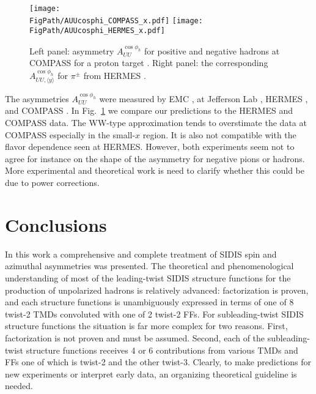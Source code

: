 \documentclass[a4paper,11pt]{article}
\newcommand*{\FigPath}{./figs}%
\begin{document}
\begin{figure}[h]
\centering
\texttt{[image: \\FigPath/AUUcosphi\_COMPASS\_x.pdf]} 
\texttt{[image: \\FigPath/AUUcosphi\_HERMES\_x.pdf]}
\caption{\label{auucosphi_jlab} 
	Left panel: asymmetry $A_{UU}^{\cos\phi_h}$ for positive and negative 
	hadrons at COMPASS for a proton target \cite{Adolph:2014pwc}. Right 
	panel: the corresponding $A_{UU, \langle y \rangle}^{\cos\phi_h}$ for $\pi^\pm$ from HERMES \cite{Airapetian:2012yg}.}
\end{figure}

The asymmetries $A_{UU}^{\cos\phi_h}$ were measured by
EMC \cite{Aubert:1983cz}, at Jefferson Lab \cite{Osipenko:2008aa,Mkrtchyan:2007sr}, 
HERMES \cite{Airapetian:2012yg}, and COMPASS \cite{Adolph:2014pwc}.
In Fig.~\ref{auucosphi_jlab} we compare our predictions to the HERMES and 
COMPASS data. 
The WW-type approximation tends to overstimate the data at
COMPASS especially in the small-$x$ region. It is also not
compatible with the flavor dependence seen at HERMES. 
However, both experiments seem not to agree for instance on the shape
of the asymmetry for negative pions or hadrons. More experimental and
theoretical work is need to clarify whether this could be due to
power corrections.




\section{Conclusions}
\label{Sec-8:conclusions}

In this work a comprehensive and complete treatment of SIDIS
spin and azimuthal asymmetries was presented. 
The theoretical and phenomenological understanding of most of the
leading-twist SIDIS structure functions for the production of 
unpolarized hadrons is relatively advanced: factorization is
proven, and each structure functions is unambiguously expressed in 
terms of one of 8 twist-2 TMDs convoluted with one of 2 twist-2 FFs.
For subleading-twist SIDIS structure functions the situation
is far more complex for two reasons. First, factorization is not 
proven and must be assumed. 
Second, each of the subleading-twist structure functions
receives 4 or 6 contributions from various TMDs and FFs one of
which is twist-2 and the other twist-3. Clearly, to make 
predictions for new experiments or interpret early data, an
organizing theoretical guideline is needed.
\end{document}

